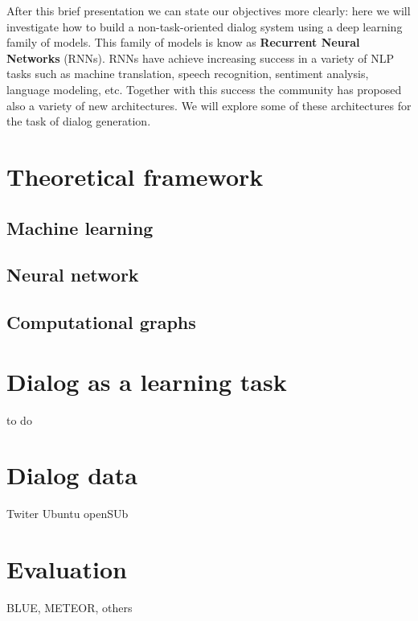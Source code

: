 \par After this brief presentation we can state our objectives more clearly: here we will investigate how to build a non-task-oriented dialog system using a deep learning family of models. This family of models is know as \textbf{Recurrent Neural Networks} (RNNs). RNNs have achieve increasing success in a variety of NLP tasks such as machine translation, speech recognition, sentiment analysis, language modeling, etc. Together with this success the community has proposed also a variety of new architectures. We will explore some of these architectures for the task of dialog generation.




\section{Theoretical framework}

\subsection{Machine learning}


\subsection{Neural network}


\subsection{Computational graphs}


\section{Dialog as a learning task}

to do 

\section{Dialog data}

Twiter Ubuntu openSUb

\section{Evaluation}

BLUE, METEOR, others 